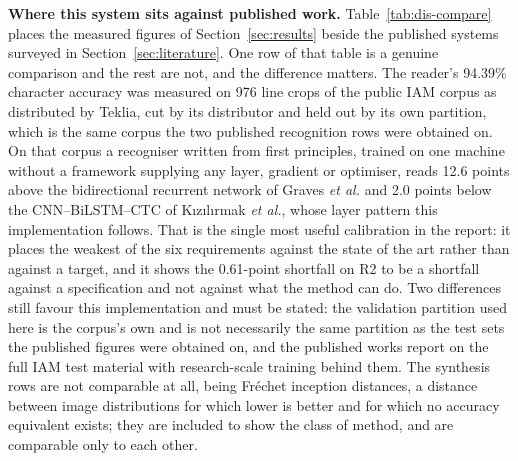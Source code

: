         \textbf{Where this system sits against published work.}
        Table~\ref{tab:dis-compare} places the measured figures of Section~\ref{sec:results} beside the published systems surveyed in Section~\ref{sec:literature}.
        One row of that table is a genuine comparison and the rest are not, and the difference matters.
        The reader's 94.39\% character accuracy was measured on 976 line crops of the public IAM corpus as distributed by Teklia, cut by its distributor and held out by its own partition, which is the same corpus the two published recognition rows were obtained on.
        On that corpus a recogniser written from first principles, trained on one machine without a framework supplying any layer, gradient or optimiser, reads 12.6 points above the bidirectional recurrent network of Graves \emph{et al.} and 2.0 points below the CNN--BiLSTM--CTC of K{\i}z{\i}l{\i}rmak \emph{et al.}, whose layer pattern this implementation follows.
        That is the single most useful calibration in the report: it places the weakest of the six requirements against the state of the art rather than against a target, and it shows the 0.61-point shortfall on R2 to be a shortfall against a specification and not against what the method can do.
        Two differences still favour this implementation and must be stated: the validation partition used here is the corpus's own and is not necessarily the same partition as the test sets the published figures were obtained on, and the published works report on the full IAM test material with research-scale training behind them.
        The synthesis rows are not comparable at all, being Fr\'echet inception distances, a distance between image distributions for which lower is better and for which no accuracy equivalent exists; they are included to show the class of method, and are comparable only to each other.

